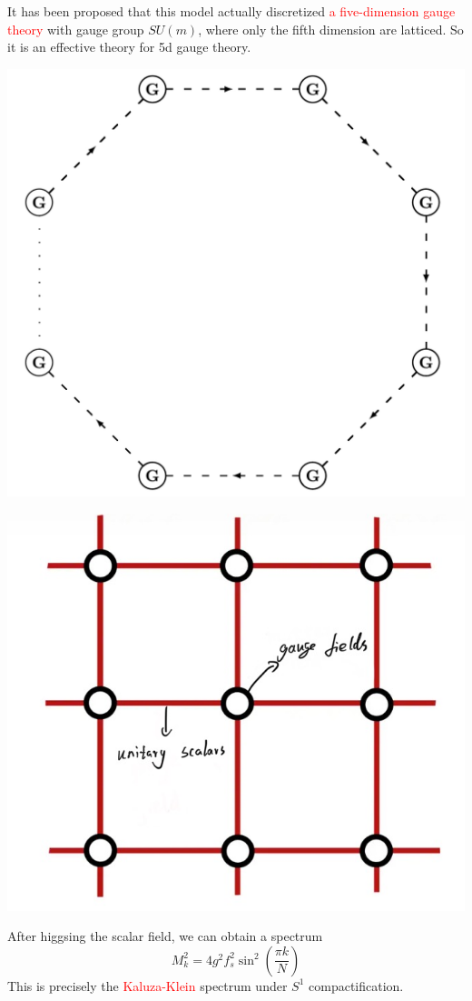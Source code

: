 \documentclass{beamer}
\begin{document}
\begin{frame}
    It has been proposed that this model actually discretized \textcolor{red}{a five-dimension gauge theory} with gauge group $SU(m)$, where 
    only the fifth dimension are latticed. So it is an effective theory for 5d gauge theory.
     \vspace{1em} %
    \begin{center}
    \begin{minipage}{0.45\textwidth}
        \centering
        \includegraphics[width=0.6\linewidth]{Moosed.jpeg} %
        \par\vspace{0.5em}
    \end{minipage}
    \hspace{0.05\textwidth}
    \begin{minipage}{0.45\textwidth}
        \centering
        \includegraphics[width=0.6\linewidth]{Lattice.jpg} %
        \par\vspace{0.5em}
    \end{minipage}
    \end{center}
    \pause
    After higgsing the scalar field, we can obtain a spectrum
    \begin{equation*}
        M_k^2=4g^2f_s^2\sin^2\left(\frac{\pi k}{N}\right)
    \end{equation*}
    This is precisely the \textcolor{red}{Kaluza-Klein} spectrum under $S^1$ compactification. 
\end{frame}
\end{document}
